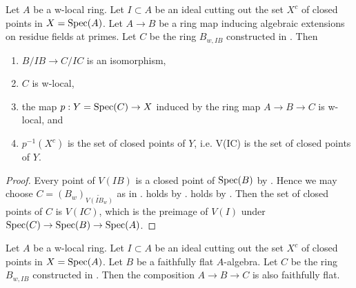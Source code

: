 \begin{lemma}
\label{thm:closed-points-isom-w-local}
\leanok
Let $A$ be a w-local ring. Let $I \subset A$ be an ideal cutting out the set $X^c$ of closed points in $X = \operatorname{Spec} (A)$.
Let $A \to B$ be a ring map inducing algebraic extensions on residue fields at primes. Let $C$ be the ring $B_{w, IB}$ constructed in . Then
\begin{enumerate}
    \item $B/IB \to C/IC$ is an isomorphism, \label{item:quotinet-isom-closed-points-isom-w-local} %
    \item $C$ is w-local, \label{item:w-local-closed-points-isom-w-local}
    \item the map $p: Y = \operatorname{Spec} (C) \to X$ induced by the ring map $A \to B \to C$ is w-local, and %
    \item $p^{-1}(X^c)$ is the set of closed points of $Y$, i.e. V(IC) is the set of closed points of $Y$. \label{item:inverse-image-closed-points-isom-w-local}
\end{enumerate}
\end{lemma}

\begin{proof}
    \leanok
    Every point of $V(IB)$ is a closed point of $\mathrm{Spec}(B)$ by 
    .
    Hence we may choose $C = (B_w)_{\widetilde{V(IB_w)}}$ as in 
    .  holds
    by . 
     holds by 
    . Then
    the set of closed points of $C$ is $V(IC)$, which is the preimage of $V(I)$ under
    $\mathrm{Spec}(C) \to \mathrm{Spec}(B) \to \mathrm{Spec}(A)$.
\end{proof}

\begin{lemma}
  Let $A$ be a w-local ring. Let $I \subset A$ be an ideal cutting out the set $X^c$ of closed points in $X = \operatorname{Spec} (A)$.
  Let $B$ be a faithfully flat $A$-algebra. Let $C$ be the ring $B_{w, IB}$ constructed in . Then
  the composition $A \to B \to C$ is also faithfully flat.
  \label{cor:closed-points-isom-w-local-faithfully-flat}
  \leanok
\end{lemma}


